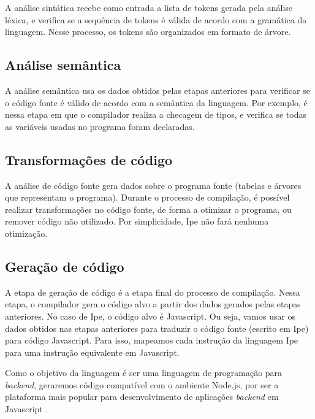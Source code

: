 A análise sintática recebe como entrada a lista de tokens gerada pela análise
léxica, e verifica se a sequência de tokens é válida de acordo com a gramática da
linguagem. Nesse processo, os tokens são organizados em formato de árvore.

\subsection{Análise semântica}

A análise semântica usa os dados obtidos pelas etapas anteriores para verificar se
o código fonte é válido de acordo com a semântica da linguagem. Por exemplo, é
nessa etapa em que o compilador realiza a checagem de tipos, e verifica se todas
as variáveis usadas no programa foram declaradas.


\subsection{Transformações de código}

A análise de código fonte gera dados sobre o programa fonte (tabelas e árvores que
representam o programa). Durante o processo de compilação, é possível realizar
transformações no código fonte, de forma a otimizar o programa, ou remover código
não utilizado. Por simplicidade, Ipe não fará nenhuma otimização.


\subsection{Geração de código}

A etapa de geração de código é a etapa final do processo de compilação. Nessa
etapa, o compilador gera o código alvo a partir dos dados gerados pelas etapas
anteriores. No caso de Ipe, o código alvo é Javascript. Ou seja, vamos usar os dados
obtidos nas etapas anteriores para traduzir o código fonte (escrito em Ipe) para
código Javascript. Para isso, mapeamos cada instrução da linguagem Ipe para uma
instrução equivalente em Javascript.

Como o objetivo da linguagem é ser uma linguagem de programação para \textit{backend},
geraremos código compatível com o ambiente Node.js, por ser a plataforma mais popular
para desenvolvimento de aplicações \textit{backend} em Javascript \cite{stackoverflowsurvey}.
